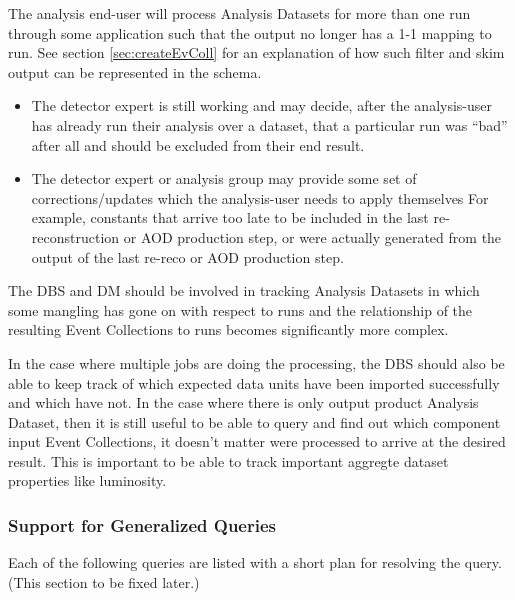 \documentclass{cmspaper}
\begin{document}
  The analysis end-user will process Analysis Datasets for more
than one run through some application such that the output no longer has
a 1-1 mapping to run. See section \ref{sec:createEvColl} for an 
explanation of how such filter and skim output can be 
represented in the schema.
\begin{itemize}
\item The detector expert is still working and may decide, after the 
     analysis-user has already run their analysis over a dataset, that a
     particular run was ``bad'' after all and should be excluded from their
     end result. 
\item The detector expert or analysis group may provide some set of
     corrections/updates which the analysis-user needs to apply themselves
     For example, constants that arrive too late to be included in 
     the last re-reconstruction or AOD production step, or were 
     actually generated from the output of
     the last re-reco or AOD production step. 
\end{itemize}
The DBS and DM should be involved in tracking Analysis Datasets in which
some mangling has gone on with respect to runs and the relationship of 
the resulting Event Collections to runs becomes significantly more complex.

In the case 
where multiple jobs are doing the processing, the DBS should also be able
to keep track of which expected data units have been imported successfully and which 
have not.  In the case where there is only output product Analysis Dataset, 
then it is still useful to be able to query and find out which component
input Event Collections, it doesn't matter were processed to 
arrive at the desired result.  This is important to be able to track important 
aggregte dataset properties like luminosity.

\subsubsection{Support for Generalized Queries}


Each of the following queries are listed with a short plan for resolving the query.
(This section to be fixed later.) 
\end{document}
